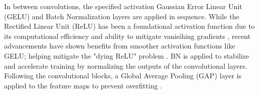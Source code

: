 \documentclass[12pt]{elsarticle}
\begin{document}
In between convolutions, the specified activation Gaussian Error Linear Unit (GELU) and Batch Normalization layers are applied in sequence. While the Rectified Linear Unit (ReLU) has been a foundational activation function due to its computational efficiency and ability to mitigate vanisihing gradients \cite{pmlr-v15-glorot11a}, recent advancements have shown benefits from smoother activation functions like GELU; helping mitigate the "dying ReLU" problem \cite{hendrycks2016GELU, lu2019dying}. BN is applied to stabilize and accelerate training \cite{ioffe2015batch} by normalizing the outputs of the convolutional layers. Following the convolutional blocks, a Global Average Pooling (GAP) layer is applied to the feature maps to prevent overfitting \cite{lin2013GAP, watanabe2021improving}. 
\begin{table}[!htbp]
    \centering
    \caption{Generalized 2D CNN Feature Extractor for Space-Time Images}
    \label{tab:cnn_architecture_condensed}
\end{table}
\end{document}
